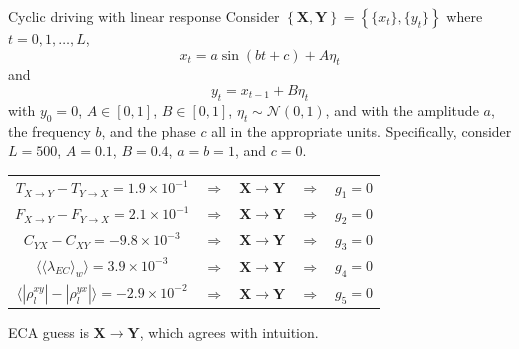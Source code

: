 \documentclass{beamer}
\begin{document}
\begin{frame}{Cyclic driving with linear response}
Consider $\left\{\mathbf{X},\mathbf{Y}\right\} = \left\{\{x_t\},\{y_t\}\right\}$ where $t=0,1,\ldots,L$,
\begin{equation*}
x_t = a\sin(bt+c)+A\eta_t
\end{equation*}
and
\begin{equation*}
y_t = x_{t-1} + B\eta_t
\end{equation*}
with $y_0 = 0$, $A\in[0,1]$, $B\in[0,1]$, $\eta_t\sim\mathcal{N}\left(0,1\right)$, and with the amplitude $a$, the frequency $b$, and the phase $c$ all in the appropriate units.  Specifically, consider $L=500$, $A=0.1$, $B=0.4$, $a=b=1$, and $c=0$.  
\begin{center}
\begin{tabular}{ccccc}
$T_{X\rightarrow Y}-T_{Y\rightarrow X} = 1.9\times 10^{-1}$&$\Rightarrow$&$\mathbf{X}\rightarrow\mathbf{Y}$&$\Rightarrow$&$g_1 = 0$\\
$F_{X\rightarrow Y}-F_{Y\rightarrow X}=2.1\times 10^{-1}$&$\Rightarrow$&$\mathbf{X}\rightarrow\mathbf{Y}$&$\Rightarrow$&$g_2 = 0$\\
$C_{YX}-C_{XY}=-9.8\times 10^{-3}$&$\Rightarrow$&$\mathbf{X}\rightarrow\mathbf{Y}$&$\Rightarrow$&$g_3 = 0$\\
$\langle\langle\lambda_{EC}\rangle_w\rangle=3.9\times 10^{-3}$&$\Rightarrow$&$\mathbf{X}\rightarrow\mathbf{Y}$&$\Rightarrow$&$g_4 = 0$\\
$\langle|\rho^{xy}_l| - |\rho^{yx}_l|\rangle=-2.9\times 10^{-2}$&$\Rightarrow$&$\mathbf{X}\rightarrow\mathbf{Y}$&$\Rightarrow$&$g_5 = 0$
\end{tabular}
\end{center}
ECA guess is $\mathbf{X}\rightarrow\mathbf{Y}$, which agrees with intuition.
\end{frame}
\end{document}
